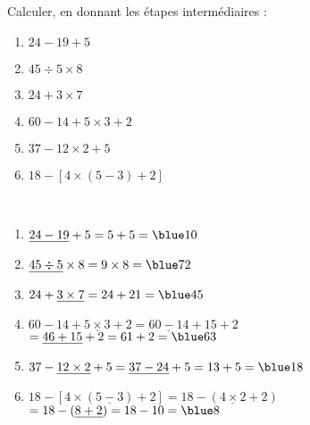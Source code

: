 \begin{exercice} %
   Calculer, en donnant les étapes intermédiaires :
   \begin{multicols}{2}
     \begin{enumerate}
        \item $24-19+5$ \smallskip
        \item $45\div5\times8$ \smallskip
        \item $24+3\times7$
        \item $60-14+5\times3+2$
        \item $37-12\times2+5$
        \item $18-[4\times(5-3)+2]$
      \end{enumerate}
   \end{multicols}
  \end{exercice}
  
  \begin{corrige}
     \ \\ [-5mm]
     \begin{enumerate}
        \item $\underline{24-19}+5 =5+5 =\blue 10$ \smallskip
        \item $\underline{45\div5}\times8 =9\times8 =\blue 72$ \smallskip
        \item $24+\underline{3\times7} =24+21 =\blue 45$ \smallskip
        \item $60-14+\underline{5\times3}+2 =\underline{60-14}+15+2$ \\
           \hspace*{33mm} $=\underline{46+15}+2 =61+2 =\blue 63$ \smallskip
        \item $37-\underline{12\times2}+5 =\underline{37-24}+5 =13+5 =\blue 18$ \smallskip
        \item $18-[4\times(\underline{5-3})+2] =18-(\underline{4\times2}+2)$ \\
           \hspace*{35.6mm} $=18-(\underline{8+2}) =18-10 =\blue 8$
     \end{enumerate}
  \end{corrige}